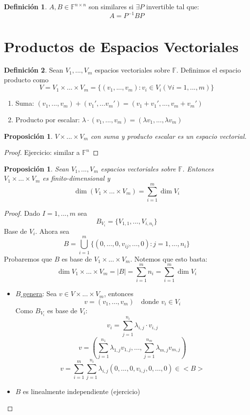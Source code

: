 \documentclass[11pt]{book}
\newtheorem{prop}[thm]{Proposición}
\theoremstyle{definition}
\newtheorem{defn}{Definición}[section]
\begin{document}
\begin{defn}
	$A,B\in\mathbb{F}^{n\times n}$ son similares si $\exists P$ invertible tal que:
	\[A=P^{-1}BP\]
\end{defn}
\section{Productos de Espacios Vectoriales}
\begin{defn}
	Sean $V_1,...,V_m$ espacios vectoriales sobre $\mathbb{F}$. Definimos el espacio producto como
	\[V=V_1\times...\times V_m=\{(v_1,...,v_m):v_i\in V_i(\forall i=1,...,m)\}\]
	\begin{enumerate}
		\item Suma: $(v_1,...,v_m)+(v_1',...v_m')=(v_1+v_1',...,v_m+v_m')$

		\item Producto por escalar: $\lambda\cdot (v_1,...,v_m)=(\lambda v_1,...,\lambda v_m)$
	\end{enumerate}
\end{defn}
\begin{prop}
	$V\times...\times V_m$ con suma y producto escalar es un espacio vectorial.
\end{prop}
\begin{proof}
	Ejercicio: similar a $\mathbb{F}^n$
\end{proof}
\begin{prop}
	Sean $V_1,...,V_m$ espacios vectoriales sobre $\mathbb{F}$. Entonces $V_1\times...\times V_m$ es finito-dimensional y
	\[\dim(V_1\times...\times V_m)=\sum^m_{i=1}\dim V_i\]
\end{prop}
\begin{proof}
	Dado $I=1,...,m$ sea
	\[B_{V_i}=\{V_{1,1},...,V_{i,n_i}\}\]
	Base de $V_i$. Ahora sea
	\[B=\bigcup^m_{i=1}\{(0,...,0,v_{ij},...,0):j=1,...,n_i\}\]
	Probaremos que $B$ es base de $V_1\times...\times V_m$. Notemos que esto basta:
	\[\dim V_1\times...\times V_m=|B|=\sum^m_{i=1}n_i=\sum^m_{i=1}\dim V_i\]
	\begin{itemize}
		\item \underline{$B$ genera}: Sea $v\in V\times...\times V_m$, entonces
		      \[v=(v_1,...,v_m)\quad\textrm{donde }v_i\in V_i\]
		      Como $B_{V_i}$ es base de $V_i$:
		      \[v_i=\sum^{n_i}_{j=1}\lambda_{i,j}\cdot v_{i,j}\]
		      \[v=\left(\sum^{n_1}_{j=1}\lambda_{1,j}v_{1,j},...,\sum^{n_m}_{j=1}\lambda_{m,j}v_{m,j}\right)\]
		      \[v=\sum^m_{i=1}\sum^{n_i}_{j=1}\lambda_{i,j}(0,...,0,v_{i,j},0,...,0)\in <B>\]

		\item $B$ es linealmente independiente (ejercicio)
	\end{itemize}
\end{proof}
\end{document}
